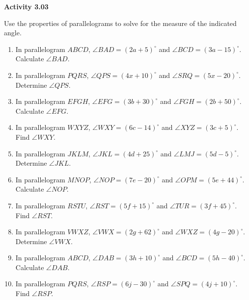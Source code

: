 \vspace{0.3ex}
\noindent\textbf{Activity 3.03}

\vspace{0.2ex}

\noindent Use the properties of parallelograms to solve for the measure of the indicated angle.

\begin{enumerate}[label=\color{blue}\arabic*.]
    \item In parallelogram \(ABCD\), \(\angle BAD = (2a+5)^\circ\) and \(\angle BCD = (3a-15)^\circ\). Calculate \(\angle BAD\).
    \item In parallelogram \(PQRS\), \(\angle QPS = (4x + 10)^\circ\) and \(\angle SRQ = (5x - 20)^\circ\). Determine \(\angle QPS\).
    \item In parallelogram \(EFGH\), \(\angle EFG = (3b + 30)^\circ\) and \(\angle FGH = (2b + 50)^\circ\). Calculate \(\angle EFG\).
    \item In parallelogram \(WXYZ\), \(\angle WXY = (6c - 14)^\circ\) and \(\angle XYZ = (3c + 5)^\circ\). Find \(\angle WXY\).
    \item In parallelogram \(JKLM\), \(\angle JKL = (4d + 25)^\circ\) and \(\angle LMJ = (5d - 5)^\circ\). Determine \(\angle JKL\).
    \item In parallelogram \(MNOP\), \(\angle NOP = (7e - 20)^\circ\) and \(\angle OPM = (5e + 44)^\circ\). Calculate \(\angle NOP\).
    \item In parallelogram \(RSTU\), \(\angle RST = (5f + 15)^\circ\) and \(\angle TUR = (3f + 45)^\circ\). Find \(\angle RST\).
    \item In parallelogram \(VWXZ\), \(\angle VWX = (2g + 62)^\circ\) and \(\angle WXZ = (4g - 20)^\circ\). Determine \(\angle VWX\).
    \item In parallelogram \(ABCD\), \(\angle DAB = (3h + 10)^\circ\) and \(\angle BCD = (5h - 40)^\circ\). Calculate \(\angle DAB\).
    \item In parallelogram \(PQRS\), \(\angle RSP = (6j - 30)^\circ\) and \(\angle SPQ = (4j + 10)^\circ\). Find \(\angle RSP\).
\end{enumerate}
